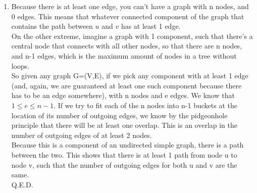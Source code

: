 
\usepackage{amsmath}

\oddsidemargin 0in
\evensidemargin 0in
\textwidth 6.5in
\topmargin -0.5in
\textheight 9.0in
\newcommand{\norm}[1]{\left\lVert #1 \right\rVert}


\pagestyle{myheadings}


\begin{enumerate}
\item
  Because there is at least one edge, you can't have a graph with n nodes, and 0 edges. This means that whatever connected component of the graph that contains the path between $u$ and $v$ has at least 1 edge.\\
  
  On the other extreme, imagine a graph with 1 component, such that there's a central node that connects with all other nodes, so that there are n nodes, and n-1 edges, which is the maximum amount of nodes in a tree without loops.\\

  So given any graph G=(V,E), if we pick any component with at least 1 edge (and, again, we are guaranteed at least one such component because there has to be an edge somewhere), with n nodes and e edges. We know that $1 \leq e \leq n-1$. If we try to fit each of the n nodes into n-1 buckets at the location of its number of outgoing edges, we know by the pidgeonhole principle that there will be at least one overlap. This is an overlap in the number of outgoing edges of at least 2 nodes.\\

  Because this is a component of an undirected simple graph, there is a path between the two. This shows that there is at least 1 path from node u to node v, such that the number of outgoing edges for both u and v are the same.\\
  Q.E.D.
  
\end{enumerate}

